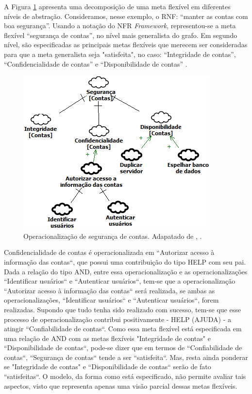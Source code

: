 \pagebreak

A Figura \ref{exemploNFR} apresenta uma decomposição de uma meta flexível em diferentes níveis de abstração. Consideramos, nesse exemplo, o RNF: “manter as contas com boa segurança”. Usando a notação do NFR \textit{Framework}, representou-se a meta flexível  “segurança de contas”, no nível mais generalista do grafo. Em segundo nível, são especificadas as principais metas flexíveis que merecem ser consideradas para que a meta generalista seja "satisfeita", no caso: “Integridade de contas”, “Confidencialidade de contas” e “Disponibilidade de contas” \cite{chung2012non}.

\begin{figure}[h!]
	\centering
	\includegraphics[keepaspectratio=true,scale=1.0]{figuras/exemploNFR.png}
	\caption{Operacionalização de segurança de contas. Adapatado de \cite{chung2012non}, \cite{affleck2012supporting}.}
	\label{exemploNFR}
\end{figure} 

Confidencialidade de contas é operacionalizada em ``Autorizar acesso à informação das contas``, que possui uma contribuição do tipo HELP com seu pai. Dada a relação do tipo AND, entre essa operacionalização e as operacionalizações ``Identificar usuários`` e ``Autenticar usuários``, tem-se que a operacionalização ``Autorizar acesso à informação das contas``  será realizada, se ambas as operacionalizações, ``Identificar usuários`` e ``Autenticar usuários``, forem realizadas. Supondo que tudo tenha sido realizado com sucesso, tem-se que esse processo de operacionalização contribui positivamente - HELP (AJUDA) - a atingir ``Confiabilidade de contas``. Como essa meta flexível está especificada em uma relação de AND com as metas flexíveis "Integridade de contas" e ``Disponibilidade de contas``, pode-se dizer que em termos de ``Confiabilidade de contas``, ``Segurança de contas`` tende a ser ``satisfeita``. Mas, resta ainda ponderar se "Integridade de contas" e ``Disponibilidade de contas`` serão de fato ``satisfeitas``. O modelo, da forma como está especificado, não permite avaliar tais aspectos, visto que representa apenas uma visão parcial dessas metas flexíveis.


